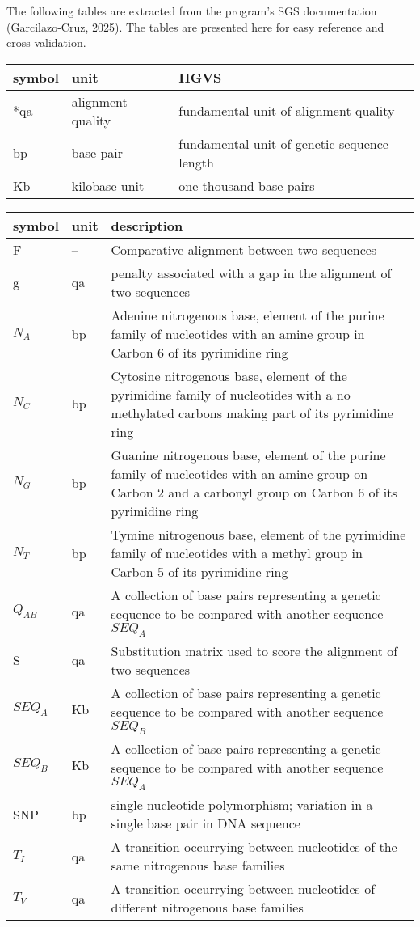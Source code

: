 \documentclass[12pt, titlepage]{article}
\begin{document}
The following tables are extracted from the program's SGS documentation (Garcilazo-Cruz, 2025).
The tables are presented here for easy reference and cross-validation.


\renewcommand{\arraystretch}{1.2}
\begin{center}
  \begin{tabular}{l l l} 
    \toprule		
    \textbf{symbol} & \textbf{unit} & \textbf{HGVS}\\
    \midrule 
    *qa & alignment quality & fundamental unit of alignment quality
    \\
    bp & base pair & fundamental unit of genetic sequence length
    \\
    Kb & kilobase unit & one thousand base pairs
    \\
    \bottomrule
  \end{tabular}
\end{center}

\noindent 
\begin{longtable}{l l p{12cm}} \toprule
  \textbf{symbol} & \textbf{unit} & \textbf{description}\\
  \midrule 
    F & -- & Comparative alignment between two sequences
    \\
    g & qa & penalty associated with a gap in the alignment of two sequences
    \\
    $N_A$ & bp & Adenine nitrogenous base, element of the purine family of nucleotides with an amine group in Carbon 6 of its pyrimidine ring
    \\
    $N_C$ & bp & Cytosine nitrogenous base, element of the pyrimidine family of nucleotides with a no methylated carbons making part of its pyrimidine ring
    \\
    $N_G$ & bp & Guanine nitrogenous base, element of the purine family of nucleotides with an amine group on Carbon 2 and a carbonyl group on Carbon 6 of its pyrimidine ring
    \\
    $N_T$ & bp & Tymine nitrogenous base, element of the pyrimidine family of nucleotides with a methyl group in Carbon 5 of its pyrimidine ring
    \\
    $Q_{AB}$ & qa & A collection of base pairs representing a genetic sequence to be compared with another sequence $SEQ_A$
    \\
    S & qa & Substitution matrix used to score the alignment of two sequences
    \\
    $SEQ_A$ & Kb & A collection of base pairs representing a genetic sequence to be compared with another sequence $SEQ_B$
    \\
    $SEQ_B$ & Kb & A collection of base pairs representing a genetic sequence to be compared with another sequence $SEQ_A$
    \\
    SNP & bp & single nucleotide polymorphism; variation in a single base pair in DNA sequence
    \\
    $T_I$ & qa & A transition occurrying between nucleotides of the same nitrogenous base families
    \\
    $T_V$ & qa & A transition occurrying between nucleotides of different nitrogenous base families
    \\
  \bottomrule
\end{longtable}
\end{document}
